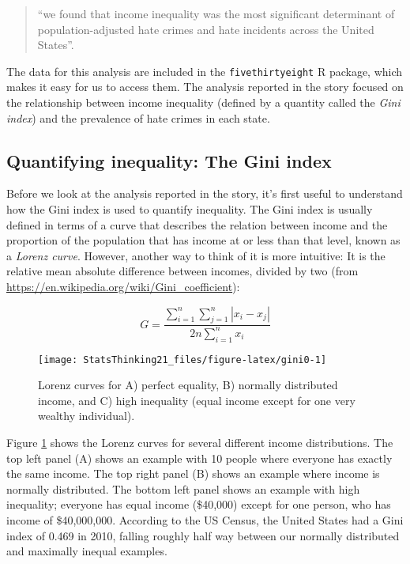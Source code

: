 \documentclass[]{book}
\theoremstyle{definition}
\theoremstyle{definition}
\theoremstyle{definition}
\theoremstyle{remark}
\begin{document}
\begin{quote}
``we found that income inequality was the most significant determinant
of population-adjusted hate crimes and hate incidents across the United
States''.
\end{quote}

The data for this analysis are included in the \texttt{fivethirtyeight}
R package, which makes it easy for us to access them. The analysis
reported in the story focused on the relationship between income
inequality (defined by a quantity called the \emph{Gini index}) and the
prevalence of hate crimes in each state.

\subsection{Quantifying inequality: The Gini
index}\label{quantifying-inequality-the-gini-index}

Before we look at the analysis reported in the story, it's first useful
to understand how the Gini index is used to quantify inequality. The
Gini index is usually defined in terms of a curve that describes the
relation between income and the proportion of the population that has
income at or less than that level, known as a \emph{Lorenz curve}.
However, another way to think of it is more intuitive: It is the
relative mean absolute difference between incomes, divided by two (from
\url{https://en.wikipedia.org/wiki/Gini_coefficient}):

\[
G = \frac{\displaystyle{\sum_{i=1}^n \sum_{j=1}^n \left| x_i - x_j \right|}}{\displaystyle{2n\sum_{i=1}^n x_i}} 
\]

\begin{figure}
\texttt{[image: StatsThinking21\_files/figure-latex/gini0-1]} \caption{Lorenz curves for A) perfect equality, B) normally distributed income, and C) high inequality (equal income except for one very wealthy individual).}\label{fig:gini0}
\end{figure}

Figure \ref{fig:gini0} shows the Lorenz curves for several different
income distributions. The top left panel (A) shows an example with 10
people where everyone has exactly the same income. The top right panel
(B) shows an example where income is normally distributed. The bottom
left panel shows an example with high inequality; everyone has equal
income (\$40,000) except for one person, who has income of \$40,000,000.
According to the US Census, the United States had a Gini index of 0.469
in 2010, falling roughly half way between our normally distributed and
maximally inequal examples.
\end{document}
